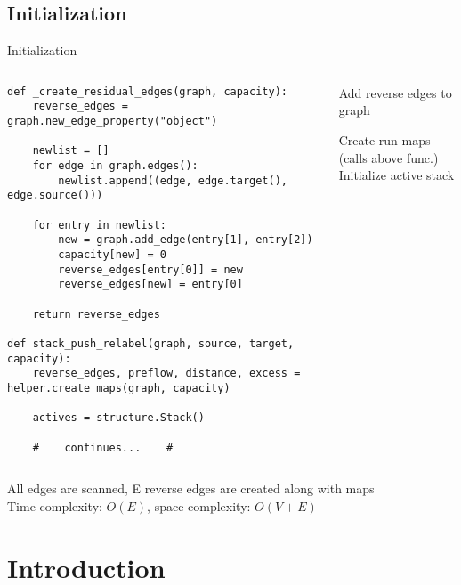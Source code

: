 \documentclass{beamer}
\begin{document}
\subsection{Initialization}
\begin{frame}[fragile]{Initialization}
    \begin{columns}[T]
        \begin{column}{0.50\textwidth}
            \begin{lstlisting}
def _create_residual_edges(graph, capacity):
    reverse_edges = graph.new_edge_property("object")

    newlist = []
    for edge in graph.edges():
        newlist.append((edge, edge.target(), edge.source()))

    for entry in newlist:
        new = graph.add_edge(entry[1], entry[2])
        capacity[new] = 0
        reverse_edges[entry[0]] = new
        reverse_edges[new] = entry[0]

    return reverse_edges

def stack_push_relabel(graph, source, target, capacity):
    reverse_edges, preflow, distance, excess = helper.create_maps(graph, capacity)

    actives = structure.Stack()

    #    continues...    #
            \end{lstlisting}
        \end{column}

        \begin{column}{0.50\textwidth}
            \begin{sidecomment}
                \pause
                \vskip 75bp
                Add reverse edges to graph

                \pause
                \vskip 40bp
                Create run maps (calls above func.)
                \\Initialize active stack
            \end{sidecomment}
        \end{column}
    \end{columns}

    \pause
    \vspace*{\fill}
    All edges are scanned, E reverse edges are created along with maps
    \\Time complexity: $O(E)$, space complexity: $O(V+E)$
\end{frame}

\section{Introduction}
\end{document}
